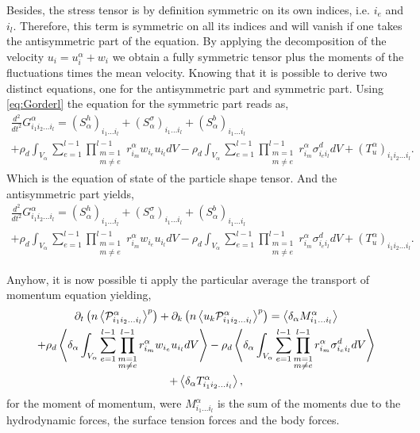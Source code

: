 Besides, the stress tensor is by definition symmetric on its own indices, i.e. $i_e$ and $i_l$. Therefore, this term is symmetric on all its indices and will vanish if one takes the antisymmetric part of the equation. 
By applying the decomposition of the velocity $u_i = u^\alpha_i + w_i$ we obtain a fully symmetric tensor plus the moments of the fluctuations times the mean velocity.
Knowing that it is possible to derive two distinct equations, one for the antisymmetric part and symmetric part. 
Using \ref{eq:Gorderl} the equation for the symmetric part reads as,
\begin{multline*}
    \frac{d^2}{dt^2}G_{i_1i_2\ldots i_l}^\alpha
    = 
    (S^h_\alpha)_{i_1\ldots i_l}
    +(S^\sigma_\alpha)_{i_1\ldots i_l}
    +(S^b_\alpha)_{i_1\ldots i_l}\\
    +\rho_d  \int_{V_\alpha} \sum_{e=1}^{l-1}  \prod^{l-1}_{\substack{ m=1 \\   m \neq e}} r^\alpha_{i_m} w_{i_e} u_{i_l}dV
    -\rho_d\int_{V_\alpha} \sum^{l-1}_{e=1} \prod^{l-1}_{\substack{m=1\\ m\neq e}}r^\alpha_{i_m}  \sigma_{i_ei_l}^d dV
    +(T_u^\alpha)_{i_1i_2\ldots i_l}.
\end{multline*}
Which is the equation of state of the particle shape tensor. 
And the antisymmetric part yields, 
\begin{multline*}
    \frac{d^2}{dt^2}G_{i_1i_2\ldots i_l}^\alpha
    = 
    (S^h_\alpha)_{i_1\ldots i_l}
    +(S^\sigma_\alpha)_{i_1\ldots i_l}
    +(S^b_\alpha)_{i_1\ldots i_l}\\
    +\rho_d  \int_{V_\alpha} \sum_{e=1}^{l-1}  \prod^{l-1}_{\substack{ m=1 \\   m \neq e}} r^\alpha_{i_m} w_{i_e} u_{i_l}dV
    -\rho_d\int_{V_\alpha} \sum^{l-1}_{e=1} \prod^{l-1}_{\substack{m=1\\ m\neq e}}r^\alpha_{i_m}  \sigma_{i_ei_l}^d dV
    +(T_u^\alpha)_{i_1i_2\ldots i_l}.
\end{multline*}

Anyhow, it is now possible ti apply the particular average the transport of momentum equation yielding, 
\begin{multline*}
    \partial_t\left(n\left<\mathcal{P}_{i_1i_2\ldots i_l}^\alpha\right>^p\right)
    +\partial_k\left(n\left<u_k\mathcal{P}_{i_1i_2\ldots i_l}^\alpha\right>^p\right)
    =
    \left<\delta_\alpha M^\alpha_{i_1\ldots i_l}\right>\\
    +\rho_d \left<\delta_\alpha  \int_{V_\alpha} \sum_{e=1}^{l-1}  \prod^{l-1}_{\substack{ m=1 \\   m \neq e}} r^\alpha_{i_m} w_{i_e} u_{i_l}dV\right>
    -\rho_d \left<\delta_\alpha \int_{V_\alpha} \sum^{l-1}_{e=1} \prod^{l-1}_{\substack{m=1\\ m\neq e}}r^\alpha_{i_m}  \sigma_{i_ei_l}^d dV\right>\\
    + \left<\delta_\alpha T^\alpha_{i_1i_2\ldots i_l}\right>,
\end{multline*}
for the moment of momentum, were
$M^\alpha_{i_1\ldots i_l}$ is the sum of the moments due to the hydrodynamic forces, the surface tension forces and the body forces.

